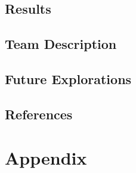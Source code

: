 \documentclass[11pt]{article}
\begin{document}
\subsection{Results}


\subsection{Team Description}


\subsection{Future Explorations}


\subsection{References}

\section*{Appendix}
\end{document}
